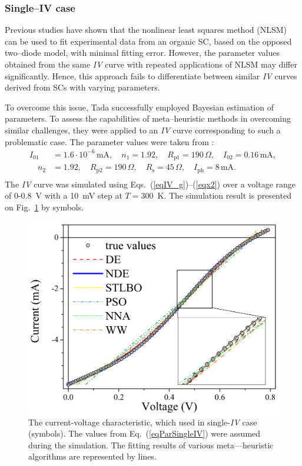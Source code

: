 \documentclass[a4paper,fleqn]{cas-sc}
\begin{document}
\subsubsection{Single--IV case}\label{SingleIV}

Previous studies \cite{Tada2015Organic,Tada2021} have shown that the nonlinear least squares method (NLSM) can be used to fit experimental data from an organic SC,
based on the opposed two--diode model, with minimal fitting error.
However, the parameter values obtained from the same \emph{IV} curve with repeated applications of NLSM may differ significantly.
Hence, this approach fails to differentiate between similar \emph{IV} curves derived from SCs with varying parameters.

To overcome this issue, Tada \cite{Tada2021} successfully employed Bayesian estimation of parameters.
To assess the capabilities of meta--heuristic methods in overcoming similar challenges,
they were applied to an \emph{IV} curve corresponding to such a problematic case.
The parameter values were taken from \cite{Tada2021}:
\begin{equation}
\label{eqParSingleIV}
\begin{split}
I_{01}&=1.6\cdot10^{-6}\,\text{mA},\quad n_1=1.92,\quad R_\mathrm{p1}=190\,\Omega,\quad I_{02}=0.16\,\text{mA},\\
\quad n_2&=1.92, \quad R_\mathrm{p2}=190\,\Omega,\quad R_\mathrm{s}=45\,\Omega,\quad I_\mathrm{ph}=8\,\text{mA}.\\
\end{split}
\end{equation}
The \emph{IV} curve was simulated using Eqs.~(\ref{eqIV_g})--(\ref{eqx2}) over a voltage range of 0-0.8~V with a 10~mV step at $T=300$~K.
The simulation result is presented on Fig.~\ref{figSigleIV} by symbols.

\begin{figure}[]
	\centering
		\includegraphics[width=0.5\columnwidth]{Fig2}
	  \caption{The current-voltage characteristic, which used in single-\emph{IV} case (symbols).
        The values from Eq.~(\ref{eqParSingleIV}) were assumed during the simulation.
        The fitting results of various meta---heuristic algorithms are represented by lines.}\label{figSigleIV}
\end{figure}
\end{document}

